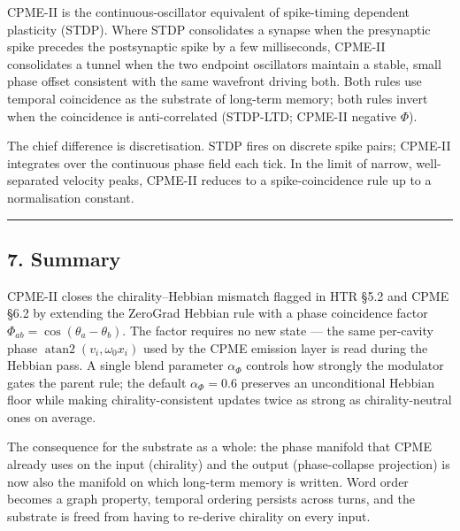 \documentclass[
  11pt,
  a4paper,
]{article}
\begin{document}
CPME-II is the continuous-oscillator equivalent of spike-timing
dependent plasticity (STDP). Where STDP consolidates a synapse when the
presynaptic spike precedes the postsynaptic spike by a few milliseconds,
CPME-II consolidates a tunnel when the two endpoint oscillators maintain
a stable, small phase offset consistent with the same wavefront driving
both. Both rules use temporal coincidence as the substrate of long-term
memory; both rules invert when the coincidence is anti-correlated
(STDP-LTD; CPME-II negative \(\Phi\)).

The chief difference is discretisation. STDP fires on discrete spike
pairs; CPME-II integrates over the continuous phase field each tick. In
the limit of narrow, well-separated velocity peaks, CPME-II reduces to a
spike-coincidence rule up to a normalisation constant.

\begin{center}\rule{0.5\linewidth}{0.5pt}\end{center}

\subsection{7. Summary}\label{summary}

CPME-II closes the chirality--Hebbian mismatch flagged in HTR §5.2 and
CPME §6.2 by extending the ZeroGrad Hebbian rule with a phase
coincidence factor \(\Phi_{ab} = \cos(\theta_a - \theta_b)\). The factor
requires no new state --- the same per-cavity phase
\(\operatorname{atan2}(v_i, \omega_0 x_i)\) used by the CPME emission
layer is read during the Hebbian pass. A single blend parameter
\(\alpha_\Phi\) controls how strongly the modulator gates the parent
rule; the default \(\alpha_\Phi = 0.6\) preserves an unconditional
Hebbian floor while making chirality-consistent updates twice as strong
as chirality-neutral ones on average.

The consequence for the substrate as a whole: the phase manifold that
CPME already uses on the input (chirality) and the output
(phase-collapse projection) is now also the manifold on which long-term
memory is written. Word order becomes a graph property, temporal
ordering persists across turns, and the substrate is freed from having
to re-derive chirality on every input.
\end{document}
